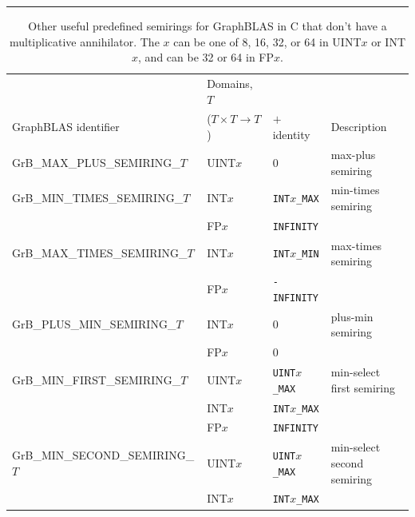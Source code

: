 \begin{table}
\centering
\begin{threeparttable}
\hrule
\caption[Other useful predefined semirings for GraphBLAS in C.]{Other useful predefined semirings for GraphBLAS in C that don't have a multiplicative annihilator. 
The $x$ can be one of 8, 16, 32, or 64 in {\sf UINT$x$} or {\sf INT$x$}, 
and can be 32 or 64 in {\sf FP$x$}.}
\label{Tab:PredefinedUsefulSemirings}

\hspace*{-1.5em}
\begin{tabular}{l|l|l|l}
                                    & Domains, $T$             &            &                 \\
GraphBLAS identifier           & ($T \times T \rightarrow T$)  & $+$ identity      & Description             \\ \hline
{\sf GrB\_MAX\_PLUS\_SEMIRING\_$T$}   & {\sf UINT$x$}            & 0                 & max-plus semiring         \\
{\sf GrB\_MIN\_TIMES\_SEMIRING\_$T$}  & {\sf INT$x$}             & {\tt INT$x$\_MAX} & min-times semiring        \\
                                    & {\sf FP$x$}              & {\tt INFINITY}    &                  \\
{\sf GrB\_MAX\_TIMES\_SEMIRING\_$T$}  & {\sf INT$x$}             & {\tt INT$x$\_MIN} & max-times semiring        \\
                                    & {\sf FP$x$}              & {\tt -INFINITY}   &                 \\
{\sf GrB\_PLUS\_MIN\_SEMIRING\_$T$}   & {\sf INT$x$}             & 0                 & plus-min semiring          \\
                                    & {\sf FP$x$}              & 0                 &                 \\ 
{\sf GrB\_MIN\_FIRST\_SEMIRING\_$T$}  & {\sf UINT$x$}            & {\tt UINT$x$\_MAX}& min-select first  semiring     \\
                                    & {\sf INT$x$}             & {\tt INT$x$\_MAX} &                 \\
                                    & {\sf FP$x$}              & {\tt INFINITY}    &                 \\
{\sf GrB\_MIN\_SECOND\_SEMIRING\_$T$} & {\sf UINT$x$}            & {\tt UINT$x$\_MAX}& min-select second semiring     \\
                                    & {\sf INT$x$}             & {\tt INT$x$\_MAX} &                 \\

\end{tabular}
\end{threeparttable}
\end{table}
